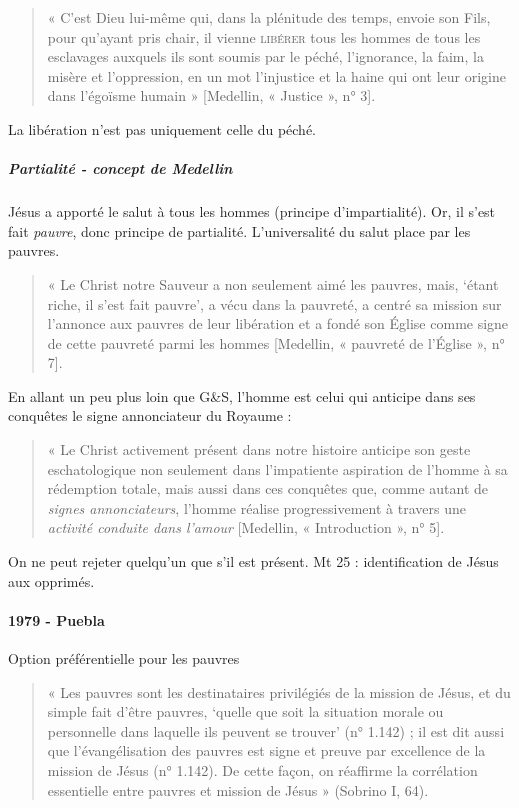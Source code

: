 \begin{quote}
    « C’est Dieu lui-même qui, dans la plénitude des temps, envoie son Fils, pour qu’ayant pris chair, il
vienne \textsc{libérer} tous les hommes de tous les esclavages auxquels ils sont soumis par le péché,
l’ignorance, la faim, la misère et l’oppression, en un mot l’injustice et la haine qui ont leur origine
dans l’égoïsme humain » [Medellin, « Justice », n° 3].
\end{quote}
La libération n'est pas uniquement celle du péché.

\subparagraph{Partialité - concept de Medellin} Jésus a apporté le salut à tous les hommes (principe d'impartialité). Or, il s'est fait \textit{pauvre}, donc principe de partialité. L'universalité du salut place par les pauvres. 
\begin{quote}
    « Le Christ notre Sauveur a non seulement aimé les pauvres, mais, ‘étant riche, il s’est fait pauvre’, a
vécu dans la pauvreté, a centré sa mission sur l’annonce aux pauvres de leur libération et a fondé son
Église comme signe de cette pauvreté parmi les hommes [Medellin, « pauvreté de l’Église », n° 7].
\end{quote}

En allant un peu plus loin que G\&S, l'homme est celui qui anticipe dans ses conquêtes le signe annonciateur du Royaume :  
\begin{quote}
   « Le Christ activement présent dans notre histoire anticipe son geste eschatologique non seulement
dans l’impatiente aspiration de l’homme à sa rédemption totale, mais aussi dans ces conquêtes que,
comme autant de \textit{signes annonciateurs}, l’homme réalise progressivement à travers une \textit{activité
conduite dans l’amour} [Medellin, « Introduction », n° 5]. 
\end{quote}

On ne peut rejeter quelqu'un que s'il est présent. Mt 25 : identification de Jésus aux opprimés.  


\paragraph{1979 - Puebla} Option préférentielle pour les pauvres
\begin{quote}
    « Les pauvres sont les destinataires privilégiés de la mission de Jésus, et du simple fait d’être pauvres,
‘quelle que soit la situation morale ou personnelle dans laquelle ils peuvent se trouver’ (n° 1.142) ; il
est dit aussi que l’évangélisation des pauvres est signe et preuve par excellence de la mission de Jésus
(n° 1.142). De cette façon, on réaffirme la corrélation essentielle entre pauvres et mission de Jésus »
(Sobrino I, 64).
\end{quote}

